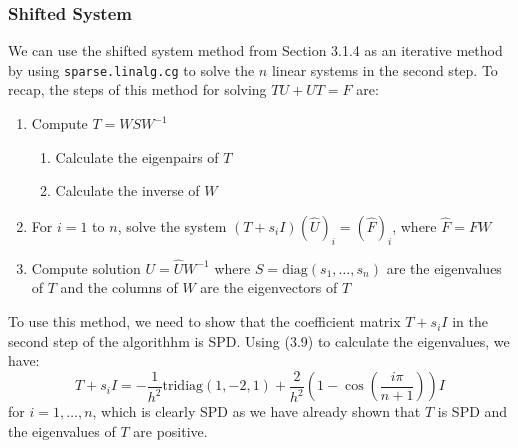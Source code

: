 \documentclass[11pt]{article}
\numberwithin{equation}{section}
\begin{document}
\subsubsection{Shifted System}
We can use the shifted system method from Section 3.1.4 as an iterative method by using \texttt{sparse.linalg.cg} to solve the $n$ linear systems in the second step. To recap, the steps of this method for solving $TU+UT=F$ are:
\begin{enumerate}
\item Compute $T = WSW^{-1}$
	\begin{enumerate}
	\item Calculate the eigenpairs of $T$
	\item Calculate the inverse of $W$
	\end{enumerate}
\item For $i=1$ to $n$, solve the system $(T+s_i I)(\hat{U})_i = (\hat{F})_i$, where $\hat{F} = FW$
\item Compute solution $U = \hat{U}W^{-1}$
where $S = \text{diag}(s_1, \dots, s_n)$ are the eigenvalues of $T$ and the columns of $W$ are the eigenvectors of $T$
\end{enumerate}
To use this method, we need to show that the coefficient matrix $T+s_i I$ in the second step of the algorithhm is SPD. Using (3.9) to calculate the eigenvalues, we have:
\begin{equation} 
T+s_i I = -\frac{1}{h^2} \text{tridiag}(1,-2,1) + \frac{2}{h^2}\left(1 - \cos\left(\frac{i\pi}{n+1}\right)\right)I
\end{equation}
for $i=1,\dots,n$, which is clearly SPD as we have already shown that $T$ is SPD and the eigenvalues of $T$ are positive.
\end{document}
